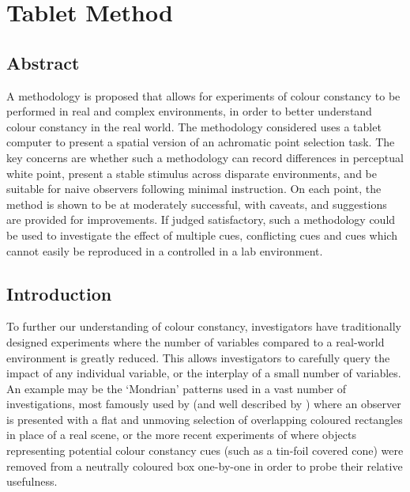 \chapter{Tablet Method}
\label{TabletMethodChapter}

\section{Abstract}

A methodology is proposed that allows for experiments of colour constancy to be performed in real and complex environments, in order to better understand colour constancy in the real world. The methodology considered uses a tablet computer to present a spatial version of an achromatic point selection task. 
The key concerns are whether such a methodology can record differences in perceptual white point, present a stable stimulus across disparate environments, and be suitable for naive observers following minimal instruction. On each point, the method is shown to be at moderately successful, with caveats, and suggestions are provided for improvements.
If judged satisfactory, such a methodology could be used to investigate the effect of multiple cues, conflicting cues and cues which cannot easily be reproduced in a controlled in a lab environment.

\section{Introduction}

To further our understanding of colour constancy, investigators have traditionally designed experiments where the number of variables compared to a real-world environment is greatly reduced. This allows investigators to carefully query the impact of any individual variable, or the interplay of a small number of variables. An example may be the `Mondrian' patterns used in a vast number of investigations, most famously used by \citet{land_retinex_1964} (and well described by \citet{hurlbert_colour_1999}) where an observer is presented with a flat and unmoving selection of overlapping coloured rectangles in place of a real scene, or the more recent experiments of \citet{kraft_mechanisms_1999} where objects representing potential colour constancy cues (such as a tin-foil covered cone) were removed from a neutrally coloured box one-by-one in order to probe their relative usefulness.

